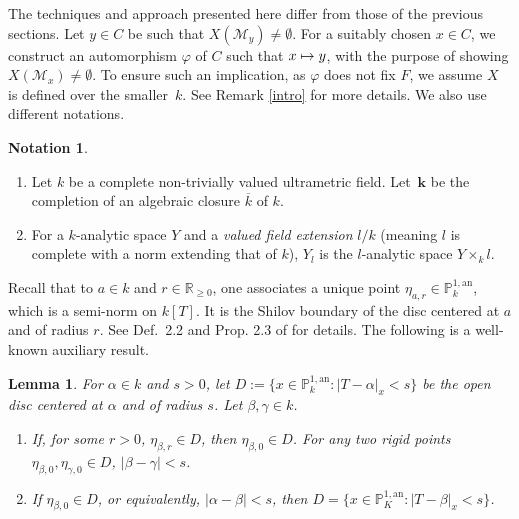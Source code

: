 \documentclass[10pt]{amsart}
\newcommand{\skpt}{\par\smallskip}
\newcommand{\mto}{\mathchoice{\longmapsto}{\mapsto}{\mapsto}{\mapsto}}
\newcommand{\bbk}{{\boldsymbol{k}}}%
\newtheorem{lm}[thm]{Lemma}
\theoremstyle{definition}
\newtheorem{nota}[thm]{Notation}
\begin{document}
The techniques and approach presented here differ from those of the previous sections. Let $y \in C$ be such that $X(\mathscr{M}_y)\neq \emptyset$. For a suitably chosen $x \in C$, we construct an automorphism $\varphi$ of $C$ such that $x \mto y$, with the purpose of showing $X(\mathscr{M}_x) \neq \emptyset$. To ensure such an implication, as $\varphi$ does not fix $F$, we assume $X$ is defined over the smaller~$k$. See Remark \ref{intro} for more details.
We also use different notations.

\skpt
\begin{nota} \label{5.0}
\begin{enumerate}
\item
Let $k$ be a complete non-trivially valued ultrametric field. Let~$\bbk$ be the completion of an algebraic closure $\overline{k}$ of $k$.

\item
For a $k$-analytic space $Y$ and a \emph{valued field extension} $l/k$ (meaning $l$ is complete with a norm extending that of $k$), $Y_l$ is the $l$-analytic space $Y \times_k l$.
\end{enumerate}
\end{nota}

Recall that to $a \in k$ and $r \in \mathbb{R}_{\geqslant 0}$, one associates a unique point $\eta_{a,r} \in \mathbb{P}_{k}^{1, \mathrm{an}}$, which is a semi-norm on $k[T]$. It is the Shilov boundary of the disc centered at $a$ and of radius $r$. See Def.~2.2 and Prop. 2.3 of \cite{une} for details. The following is a well-known auxiliary result.

\begin{lm} \label{5.2} For $\alpha \in k$ and $s>0$, let $D:=\{x \in \mathbb{P}_k^{1, \mathrm{an}}: |T- \alpha|_x<s\}$ be the open disc centered at $\alpha$ and of radius $s$.
Let $\beta, \gamma \in k$.

\begin{enumerate}
\item
If, for some $r\!>\!0$, $\eta_{\beta, r}\!\in\! D$, then $\eta_{\beta,0} \!\in\! D$. For any two rigid points \hbox{$\eta_{\beta, 0}, \eta_{\gamma,0}\!\in\! D$}, $|\beta-\gamma|<s$.

\item
If $\eta_{\beta, 0} \in D$, or equivalently, $|\alpha-\beta|<s$, then $D=\{x \in \mathbb{P}_{K}^{1, \mathrm{an}}: |T-\beta|_x <s\}$.
\end{enumerate}
\end{lm}
\end{document}
